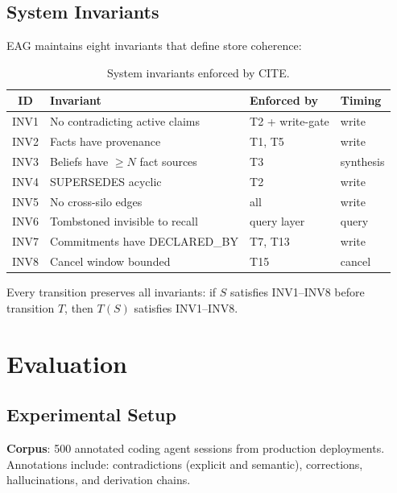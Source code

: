 \documentclass[11pt,a4paper]{article}
\begin{document}
\subsection{System Invariants}

EAG maintains eight invariants that define store coherence:

\begin{table}[H]
\centering
\caption{System invariants enforced by CITE.}
\label{tab:invariants}
\begin{tabular}{@{}clll@{}}
\toprule
\textbf{ID} & \textbf{Invariant} & \textbf{Enforced by} & \textbf{Timing} \\
\midrule
INV1 & No contradicting active claims & T2 + write-gate & write \\
INV2 & Facts have provenance & T1, T5 & write \\
INV3 & Beliefs have $\geq N$ fact sources & T3 & synthesis \\
INV4 & SUPERSEDES acyclic & T2 & write \\
INV5 & No cross-silo edges & all & write \\
INV6 & Tombstoned invisible to recall & query layer & query \\
INV7 & Commitments have DECLARED\_BY & T7, T13 & write \\
INV8 & Cancel window bounded & T15 & cancel \\
\bottomrule
\end{tabular}
\end{table}

Every transition preserves all invariants: if $S$ satisfies INV1--INV8 before transition $T$, then $T(S)$ satisfies INV1--INV8.

\section{Evaluation}
\label{sec:eval}

\subsection{Experimental Setup}

\textbf{Corpus}: 500 annotated coding agent sessions from production deployments. Annotations include: contradictions (explicit and semantic), corrections, hallucinations, and derivation chains.
\end{document}
